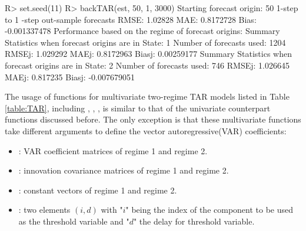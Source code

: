 \begin{example}
R> set.seed(11)
R> backTAR(est, 50, 1, 3000)
Starting forecast origin:  50 
1-step to  1 -step out-sample forecasts 
RMSE:  1.02828 
 MAE:  0.8172728 
Bias:  -0.001337478 
Performance based on the regime of forecast origins:  
Summary Statistics when forecast origins are in State:  1 
Number of forecasts used:  1204 
RMSEj:  1.029292 
 MAEj:  0.8172963 
Biasj:  0.00259177 
Summary Statistics when forecast origins are in State:  2 
Number of forecasts used:  746 
RMSEj:  1.026645 
 MAEj:  0.817235 
Biasj:  -0.007679051 
\end{example}

The usage of functions for multivariate two-regime TAR models listed in Table \ref{table:TAR}, including , , ,  is similar to that of the univariate
counterpart functions discussed before. The only exception is that these multivariate functions
take different arguments to define the vector autoregressive(VAR) coefficients:
\begin{itemize}\setlength\itemsep{-0.3em}
\item {}: VAR coefficient matrices of regime 1 and regime 2.
\item {}: innovation covariance matrices of regime 1 and regime 2.
\item {}: constant vectors of regime 1 and regime 2.
\item {}: two elements $(i,d)$ with "$i$" being the index of the component to be used as the threshold variable and "$d$" the delay for threshold variable. 
\end{itemize}


